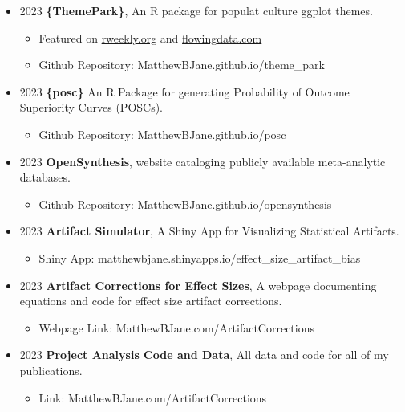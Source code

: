 \documentclass[
  letterpaper,
  DIV=11,
  numbers=noendperiod]{scrartcl}
\providecommand{\tightlist}{%
  \setlength{\itemsep}{0pt}\setlength{\parskip}{0pt}}\usepackage{longtable,booktabs,array}
\begin{document}
\begin{itemize}
\tightlist
\item
  2023 \textbar{} \textbf{\{ThemePark\}}, An R package for populat
  culture ggplot themes.

  \begin{itemize}
  \tightlist
  \item
    Featured on \href{https://rweekly.org/2023-W32.html}{rweekly.org}
    and \href{}{flowingdata.com}
  \item
    Github Repository: MatthewBJane.github.io/theme\_park
  \end{itemize}
\item
  2023 \textbar{} \textbf{\{posc\}} An R Package for generating
  Probability of Outcome Superiority Curves (POSCs).

  \begin{itemize}
  \tightlist
  \item
    Github Repository: MatthewBJane.github.io/posc
  \end{itemize}
\item
  2023 \textbar{} \textbf{OpenSynthesis}, website cataloging publicly
  available meta-analytic databases.

  \begin{itemize}
  \tightlist
  \item
    Github Repository: MatthewBJane.github.io/opensynthesis
  \end{itemize}
\item
  2023 \textbar{} \textbf{Artifact Simulator}, A Shiny App for
  Visualizing Statistical Artifacts.

  \begin{itemize}
  \tightlist
  \item
    Shiny App: matthewbjane.shinyapps.io/effect\_size\_artifact\_bias
  \end{itemize}
\item
  2023 \textbar{} \textbf{Artifact Corrections for Effect Sizes}, A
  webpage documenting equations and code for effect size artifact
  corrections.

  \begin{itemize}
  \tightlist
  \item
    Webpage Link: MatthewBJane.com/ArtifactCorrections
  \end{itemize}
\item
  2023 \textbar{} \textbf{Project Analysis Code and Data}, All data and
  code for all of my publications.

  \begin{itemize}
  \tightlist
  \item
    Link: MatthewBJane.com/ArtifactCorrections
  \end{itemize}
\end{itemize}
\end{document}
